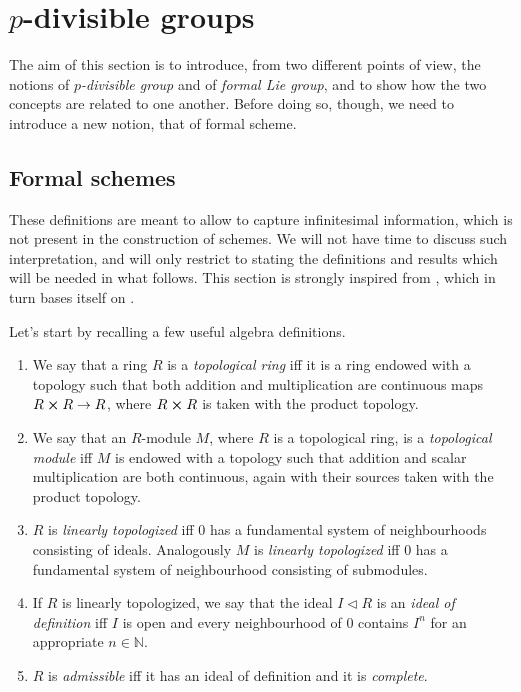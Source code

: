 \section{\texorpdfstring{$p$}{p}-divisible groups}
The aim of this section is to introduce, from two different points of view,
the notions of {\em $p$-divisible group} and of {\em formal Lie group},
and to show how the two concepts are related to one another.
Before doing so, though, we need to introduce a new notion, that
of formal scheme.


\subsection{Formal schemes}
These definitions are meant to allow to capture infinitesimal
information, which is not present in the construction of schemes.
We will not have time to discuss such interpretation, and will
only restrict to stating the definitions and results which will
be needed in what follows.
This section is strongly inspired from 
\cite[\href{https://stacks.math.columbia.edu/tag/0AHY}{Section 0AHY}]{SP},
which in turn bases itself on \cite[Chapter I, \S10]{EGA}.

Let's start by recalling a few useful algebra definitions.


\begin{defn}\leavevmode\vspace{-1\baselineskip}
\begin{enumerate}
\item We say that a ring $R$ is a {\em topological ring} iff it is a ring endowed with a topology
	such that both addition and multiplication are continuous maps
	$R \cross R \to R$, where $R \cross R$ is taken with the product topology.

\item We say that an $R$-module $M$, where $R$ is a topological ring,
	is a {\em topological module} iff $M$ is endowed with a topology such that
	addition and scalar multiplication are both continuous, again with their sources
	taken with the product topology.

\item $R$ is {\em linearly topologized} iff $0$ has a fundamental system
	of neighbourhoods consisting of ideals.
	Analogously $M$ is {\em linearly topologized} iff $0$ has a fundamental
	system of neighbourhood consisting of submodules.

\item If $R$ is linearly topologized, we say that the ideal $I \triangleleft R$
	is an {\em ideal of definition} iff $I$ is open and every neighbourhood
	of $0$ contains $I^n$ for an appropriate $n \in \mathbb{N}$.

\item $R$ is {\em admissible} iff it has an ideal of definition and it is {\em complete}.
\end{enumerate}
\end{defn}


